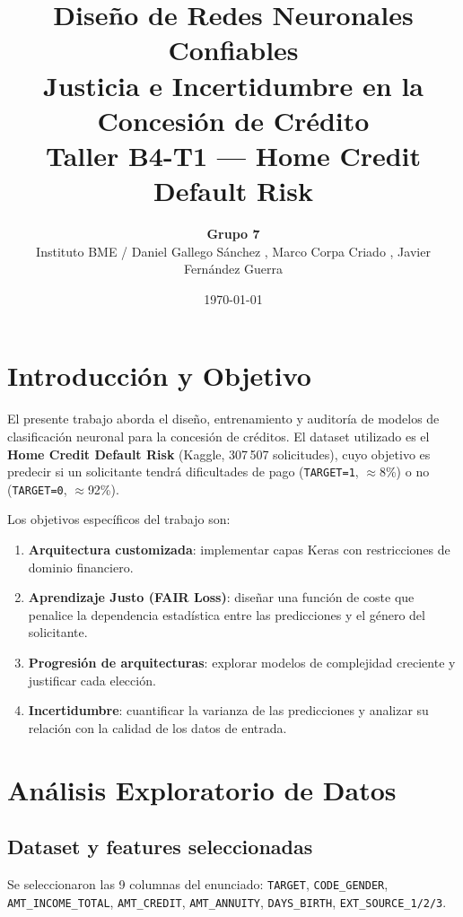 \documentclass[12pt,a4paper]{article}
\title{
    \vspace{-1cm}
    \Large\textbf{Diseño de Redes Neuronales Confiables}\\[0.4cm]
    \large Justicia e Incertidumbre en la Concesión de Crédito\\[0.3cm]
    \normalsize Taller B4-T1 --- Home Credit Default Risk
}
\author{
    \textbf{Grupo 7} \\[0.2cm]
    \small Instituto BME /
    Daniel Gallego Sánchez , Marco Corpa Criado , Javier Fernández Guerra
}
\date{\today}
\begin{document}
\maketitle
\tableofcontents
\newpage

\section{Introducción y Objetivo}
\label{sec:intro}

El presente trabajo aborda el diseño, entrenamiento y auditoría de modelos
de clasificación neuronal para la concesión de créditos. El dataset utilizado
es el \textbf{Home Credit Default Risk} (Kaggle, 307\,507 solicitudes),
cuyo objetivo es predecir si un solicitante tendrá dificultades de pago
(\texttt{TARGET=1}, $\approx$8\%) o no (\texttt{TARGET=0}, $\approx$92\%).

Los objetivos específicos del trabajo son:

\begin{enumerate}[leftmargin=*, label=\textbf{\arabic*.}]
    \item \textbf{Arquitectura customizada}: implementar capas Keras con restricciones de dominio financiero.
    \item \textbf{Aprendizaje Justo (FAIR Loss)}: diseñar una función de coste que penalice la dependencia estadística entre las predicciones y el género del solicitante.
    \item \textbf{Progresión de arquitecturas}: explorar modelos de complejidad creciente y justificar cada elección.
    \item \textbf{Incertidumbre}: cuantificar la varianza de las predicciones y analizar su relación con la calidad de los datos de entrada.
\end{enumerate}

\section{Análisis Exploratorio de Datos}
\label{sec:eda}

\subsection{Dataset y features seleccionadas}

Se seleccionaron las 9 columnas del enunciado:
\texttt{TARGET}, \texttt{CODE\_GENDER}, \texttt{AMT\_INCOME\_TOTAL},
\texttt{AMT\_CREDIT}, \texttt{AMT\_ANNUITY}, \texttt{DAYS\_BIRTH},
\texttt{EXT\_SOURCE\_1/2/3}.
\end{document}
